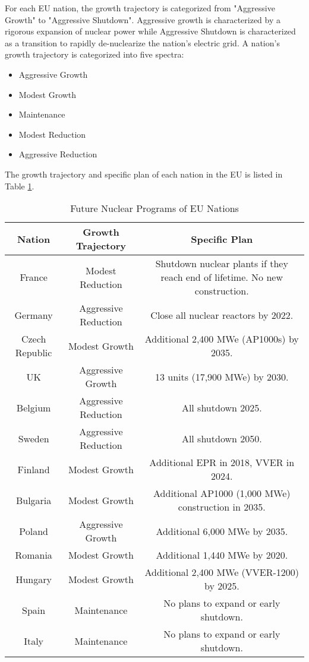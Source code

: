 For each EU nation, the growth trajectory is categorized from
"Aggressive Growth" to "Aggressive Shutdown". Aggressive growth is
characterized by a rigorous expansion of nuclear power while 
Aggressive Shutdown is characterized as a transition to rapidly
de-nuclearize the nation's electric grid. A nation's growth trajectory is
categorized into five spectra:

\begin{itemize}
	\item Aggressive Growth
	\item Modest Growth 
	\item Maintenance
	\item Modest Reduction
	\item Aggressive Reduction
\end{itemize}

The growth trajectory and specific plan of each nation in the EU 
is listed in Table \ref{tab:eu_growth}.

\begin{table}[h]
	\centering
	\label{tab:eu_growth}
		\begin{tabular}{|c|c|c|}
			\hline
			Nation & Growth Trajectory & Specific Plan \\
			\hline
			France & Modest Reduction & Shutdown nuclear plants if they reach end of lifetime. No new construction.\\
			Germany & Aggressive Reduction & Close all nuclear reactors by 2022.\\
			Czech Republic & Modest Growth & Additional 2,400 MWe (AP1000s) by 2035.\\
			UK & Aggressive Growth & 13 units (17,900 MWe) by 2030.\\
			Belgium & Aggressive Reduction & All shutdown 2025.\\
			Sweden & Aggressive Reduction & All shutdown 2050.\\
			Finland & Modest Growth & Additional EPR in 2018, VVER in 2024.\\
			Bulgaria & Modest Growth & Additional AP1000 (1,000 MWe) construction in 2035. \\
			Poland & Aggressive Growth & Additional 6,000 MWe by 2035.\\
			Romania & Modest Growth & Additional 1,440 MWe by 2020. \\
			Hungary & Modest Growth & Additional 2,400 MWe (VVER-1200) by 2025. \\ 
			Spain & Maintenance & No plans to expand or early shutdown. \\
			Italy & Maintenance  & No plans to expand or early shutdown. \\
			\hline
		\end{tabular}
	\caption {Future Nuclear Programs of EU Nations \cite{world_nuclear_association_nuclear_2017}}
\end{table}

